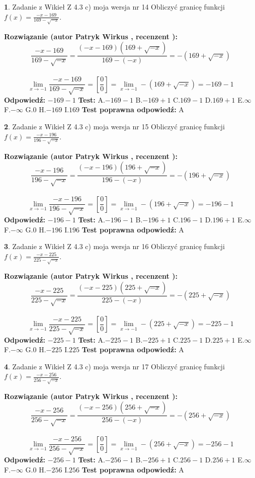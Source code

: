 \documentclass[12pt, a4paper]{article}
\theoremstyle{definition} %
\newtheorem{zad}{}
\newcommand{\zadStart}[1]{\begin{zad}#1\newline}
\newcommand{\zadStop}{\end{zad}}
\newcommand{\rozwStart}[2]{\noindent \textbf{Rozwiązanie (autor #1 , recenzent #2): }\newline}
\newcommand{\rozwStop}{\newline}
\newcommand{\odpStart}{\noindent \textbf{Odpowiedź:}\newline}
\newcommand{\odpStop}{\newline}
\newcommand{\testStart}{\noindent \textbf{Test:}\newline}
\newcommand{\testStop}{\newline}
\newcommand{\kluczStart}{\noindent \textbf{Test poprawna odpowiedź:}\newline}
\newcommand{\kluczStop}{\newline}
\begin{document}
\zadStart{Zadanie z Wikieł Z 4.3 c) moja wersja nr 14}
Obliczyć granicę funkcji $f(x)=\frac{-x-169}{169-\sqrt{-x}}$.
\zadStop
\rozwStart{Patryk Wirkus}{}
$$\frac{-x-169}{169-\sqrt{-x}}=\frac{(-x-169)(169+\sqrt{-x})}{169-(-x)}=-(169+\sqrt{-x})$$
\\
$$\lim\limits_{x\to-1}\frac{-x-169}{169-\sqrt{-x}}=[\frac{0}{0}]=\lim\limits_{x\to-1}-(169+\sqrt{-x}) =-169-1$$
\rozwStop
\odpStart
$-169-1$
\odpStop
\testStart
A.$-169-1$
B.$-169+1$
C.$169-1$
D.$169+1$
E.$\infty$
F.$-\infty$
G.$0$
H.$-169$
I.$169$
\testStop
\kluczStart
A
\kluczStop



\zadStart{Zadanie z Wikieł Z 4.3 c) moja wersja nr 15}
Obliczyć granicę funkcji $f(x)=\frac{-x-196}{196-\sqrt{-x}}$.
\zadStop
\rozwStart{Patryk Wirkus}{}
$$\frac{-x-196}{196-\sqrt{-x}}=\frac{(-x-196)(196+\sqrt{-x})}{196-(-x)}=-(196+\sqrt{-x})$$
\\
$$\lim\limits_{x\to-1}\frac{-x-196}{196-\sqrt{-x}}=[\frac{0}{0}]=\lim\limits_{x\to-1}-(196+\sqrt{-x}) =-196-1$$
\rozwStop
\odpStart
$-196-1$
\odpStop
\testStart
A.$-196-1$
B.$-196+1$
C.$196-1$
D.$196+1$
E.$\infty$
F.$-\infty$
G.$0$
H.$-196$
I.$196$
\testStop
\kluczStart
A
\kluczStop



\zadStart{Zadanie z Wikieł Z 4.3 c) moja wersja nr 16}
Obliczyć granicę funkcji $f(x)=\frac{-x-225}{225-\sqrt{-x}}$.
\zadStop
\rozwStart{Patryk Wirkus}{}
$$\frac{-x-225}{225-\sqrt{-x}}=\frac{(-x-225)(225+\sqrt{-x})}{225-(-x)}=-(225+\sqrt{-x})$$
\\
$$\lim\limits_{x\to-1}\frac{-x-225}{225-\sqrt{-x}}=[\frac{0}{0}]=\lim\limits_{x\to-1}-(225+\sqrt{-x}) =-225-1$$
\rozwStop
\odpStart
$-225-1$
\odpStop
\testStart
A.$-225-1$
B.$-225+1$
C.$225-1$
D.$225+1$
E.$\infty$
F.$-\infty$
G.$0$
H.$-225$
I.$225$
\testStop
\kluczStart
A
\kluczStop



\zadStart{Zadanie z Wikieł Z 4.3 c) moja wersja nr 17}
Obliczyć granicę funkcji $f(x)=\frac{-x-256}{256-\sqrt{-x}}$.
\zadStop
\rozwStart{Patryk Wirkus}{}
$$\frac{-x-256}{256-\sqrt{-x}}=\frac{(-x-256)(256+\sqrt{-x})}{256-(-x)}=-(256+\sqrt{-x})$$
\\
$$\lim\limits_{x\to-1}\frac{-x-256}{256-\sqrt{-x}}=[\frac{0}{0}]=\lim\limits_{x\to-1}-(256+\sqrt{-x}) =-256-1$$
\rozwStop
\odpStart
$-256-1$
\odpStop
\testStart
A.$-256-1$
B.$-256+1$
C.$256-1$
D.$256+1$
E.$\infty$
F.$-\infty$
G.$0$
H.$-256$
I.$256$
\testStop
\kluczStart
A
\kluczStop
\end{document}
